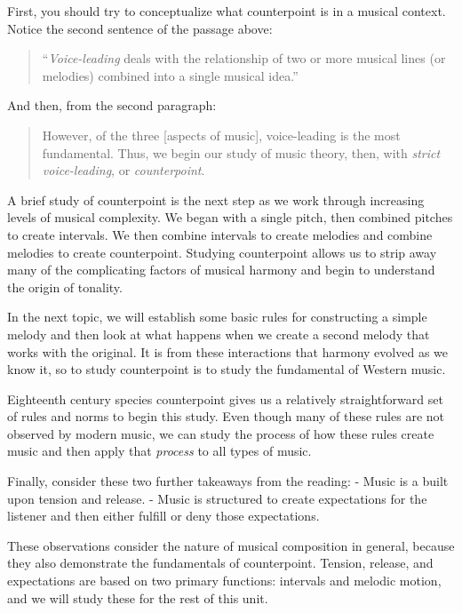 \documentclass{book}
\begin{document}
First, you should try to conceptualize what counterpoint is in a musical
context. Notice the second sentence of the passage above:

\begin{quote}
``\emph{Voice-leading} deals with the relationship of two or more musical
lines (or melodies) combined into a single musical idea.''
\end{quote}

And then, from the second paragraph:

\begin{quote}
However, of the three {[}aspects of music{]}, voice-leading is the most
fundamental. Thus, we begin our study of music theory, then, with \emph{strict
voice-leading}, or \emph{counterpoint}.
\end{quote}

A brief study of counterpoint is the next step as we work through increasing
levels of musical complexity. We began with a single pitch, then combined
pitches to create intervals. We then combine intervals to create melodies and
combine melodies to create counterpoint. Studying counterpoint allows us to
strip away many of the complicating factors of musical harmony and begin to
understand the origin of tonality.

In the next topic, we will establish some basic rules for constructing a
simple melody and then look at what happens when we create a second melody
that works with the original. It is from these interactions that harmony
evolved as we know it, so to study counterpoint is to study the fundamental of
Western music.

Eighteenth century species counterpoint gives us a relatively straightforward
set of rules and norms to begin this study. Even though many of these rules
are not observed by modern music, we can study the process of how these rules
create music and then apply that \emph{process} to all types of music.

Finally, consider these two further takeaways from the reading: - Music is a
built upon tension and release. - Music is structured to create expectations
for the listener and then either fulfill or deny those expectations.

These observations consider the nature of musical composition in general,
because they also demonstrate the fundamentals of counterpoint. Tension,
release, and expectations are based on two primary functions: intervals and
melodic motion, and we will study these for the rest of this unit.
\end{document}
